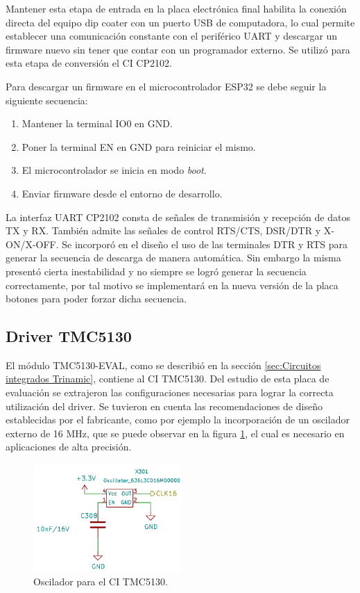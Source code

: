 Mantener esta etapa de entrada en la placa electrónica final habilita la conexión directa del equipo dip coater con un puerto USB de computadora, lo cual permite establecer una comunicación constante con el periférico UART y descargar un firmware nuevo sin tener que contar con un programador externo. Se utilizó para esta etapa de conversión el CI CP2102.

Para descargar un firmware en el microcontrolador ESP32 se debe seguir la siguiente secuencia:
\begin{enumerate}
\item Mantener la terminal IO0 en GND.
\item Poner la terminal EN en GND para reiniciar el mismo.
\item El microcontrolador se inicia en modo \textit{boot}.
\item Enviar firmware desde el entorno de desarrollo. 
\end{enumerate}

La interfaz UART CP2102 consta de señales de transmisión y recepción de datos TX y RX. También admite las señales de control RTS/CTS, DSR/DTR y X-ON/X-OFF. Se incorporó en el diseño el uso de las terminales DTR y RTS para generar la secuencia de descarga de manera automática. Sin embargo la misma presentó cierta inestabilidad y no siempre se logró generar la secuencia correctamente, por tal motivo se implementará en la nueva versión de la placa botones para poder forzar dicha secuencia.



\subsection{Driver TMC5130}

El módulo TMC5130-EVAL, como se describió en la sección \ref{sec:Circuitos integrados Trinamic}, contiene al CI TMC5130. Del estudio de esta placa de evaluación se extrajeron las configuraciones necesarias para lograr la correcta utilización del driver. Se tuvieron en cuenta las recomendaciones de diseño establecidas por el fabricante, como por ejemplo la incorporación de un oscilador externo de 16 MHz, que se puede observar en la figura \ref{fig:kicad_clock}, el cual es necesario en aplicaciones de alta precisión. 

\begin{figure}[h!]
	\centering
	\includegraphics[width=0.5\textwidth]{./Figures/kicad_clock.png}
	\caption{Oscilador para el CI TMC5130.}
	\label{fig:kicad_clock}
\end{figure}



